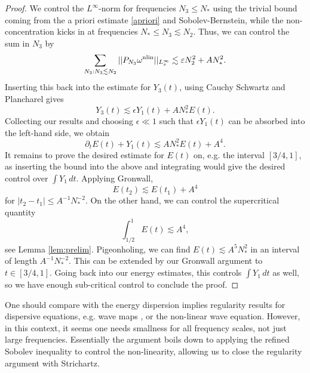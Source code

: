 \begin{proof}
	We control the $L^\infty$-norm for frequencies $N_3 \leq N_*$ using the trivial bound coming from the a priori estimate \eqref{apriori} and Sobolev-Bernstein, while the non-concentration kicks in at frequencies $N_* \leq N_3 \lesssim N_2$. Thus, we can control the sum in $N_3$ by 
		\[
			\sum_{\substack{N_3 : N_3 \lesssim N_2}} ||P_{N_3} \omega^{\mathrm{nlin}}||_{L^\infty_x} \lesssim \varepsilon N_2^2 + AN_*^2. 
		\]	
	Inserting this back into the estimate for $Y_3(t)$, using Cauchy Schwartz and Plancharel gives
		\[
			Y_3 (t) \lesssim \epsilon Y_1 (t) + AN_*^2 E(t).
		\]	
	Collecting our results and choosing $\epsilon \ll 1$ such that $\epsilon Y_1 (t)$ can be absorbed into the left-hand side, we obtain
		\[
			\partial_t E(t) + Y_1 (t) \lesssim AN_*^2 E(t) + A^4. 
		\]	
	It remains to prove the desired estimate for $E(t)$ on, e.g. the interval $[3/4, 1]$, as inserting the bound into the above and integrating would give the desired control over $\int Y_1 \, dt$. Applying Gronwall, 
		\[
			E(t_2) \lesssim E(t_1) + A^4
		\]	
	for $|t_2 - t_1| \leq A^{-1} N_*^{-2}$. On the other hand, we can control the supercritical quantity 
		\[
			\int_{1/2}^1 E(t) \lesssim A^4,
		\]	
	see Lemma \ref{lem:prelim}. Pigeonholing, we can find $E(t) \lesssim A^5 N_*^2$ in an interval of length $A^{-1} N_*^{-2}$. This can be extended by our Gronwall argument to $t \in [3/4, 1]$. Going back into our energy estimates, this controls $\int Y_1 \, dt$ as well, so we have enough sub-critical control to conclude the proof. 
\end{proof}

\begin{remark}
	One should compare with the energy dispersion implies regularity results for dispersive equations, e.g. wave maps \cite{SterbenzTataru2010a}, or the non-linear wave equation. However, in this context, it seems one needs smallness for all frequency scales, not just large frequencies. Essentially the argument boils down to applying the refined Sobolev inequality to control the non-linearity, allowing us to close the regularity argument with Strichartz. 
\end{remark}


